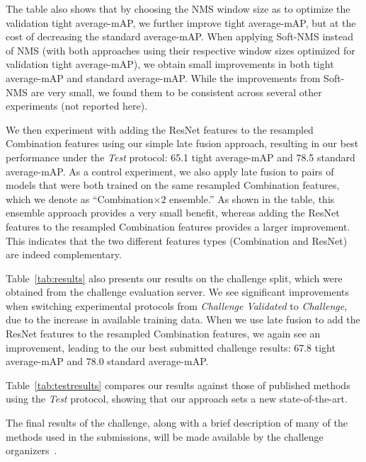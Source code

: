 \documentclass[10pt,twocolumn,letterpaper]{article}
\begin{document}
The table also shows that by choosing the NMS window size as to optimize the validation tight average-mAP, we further improve tight average-mAP, but at the cost of decreasing the standard average-mAP. When applying Soft-NMS instead of NMS (with both approaches using their respective window sizes optimized for validation tight average-mAP), we obtain small improvements in both tight average-mAP and standard average-mAP. While the improvements from Soft-NMS are very small, we found them to be consistent across several other experiments (not reported here).

We then experiment with adding the ResNet features to the resampled Combination features using our simple late fusion approach, resulting in our best performance under the {\it Test} protocol: 65.1 tight average-mAP and 78.5 standard average-mAP. As a control experiment, we also apply late fusion to pairs of models that were both trained on the same resampled Combination features, which we denote as ``Combination$\times 2$ ensemble.'' As shown in the table, this ensemble approach provides a very small benefit, whereas adding the ResNet features to the resampled Combination features provides a larger improvement. This indicates that the two different features types (Combination and ResNet) are indeed complementary.

Table~\ref{tab:results} also presents our results on the challenge split, which were obtained from the challenge evaluation server. We see significant improvements when switching experimental protocols from {\it Challenge Validated} to {\it Challenge}, due to the increase in available training data. When we use late fusion to add the ResNet features to the resampled Combination features, we again see an improvement, leading to the our best submitted challenge results: 67.8 tight average-mAP and 78.0 standard average-mAP.

Table~\ref{tab:testresults} compares our results against those of published methods using the {\it Test} protocol, showing that our approach sets a new state-of-the-art.

The final results of the challenge, along with a brief description of many of the methods used in the submissions, will be made available by the challenge organizers~\cite{mmsports, spottingchallenge}.
\end{document}
